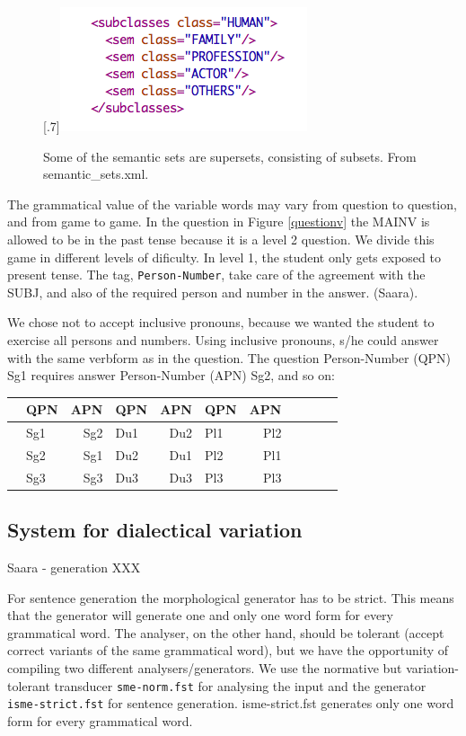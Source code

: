 \documentclass[a4paper,12pt]{article}
\begin{document}
\begin{figure}[htbp]
\begin{center}
\scalebox{.7}[.7]{\includegraphics{img/semantic_set.png}}\\
\caption{Some of the semantic sets are supersets, consisting of subsets. From semantic\_sets.xml.}
\label{semset}
\end{center}
\end{figure}

The grammatical value of the variable words may vary from question to question, and from game to game.
In the question in Figure \ref{questionv} the MAINV is allowed to be in the past tense because it is a level 2 question. We divide this game in different levels of dificulty. In level 1, the student only gets exposed to present tense. The tag, \texttt{Person-Number}, take care of the agreement with the SUBJ, and also of the required person and number in the answer. (Saara).

We chose not to accept inclusive pronouns, because we wanted the student to exercise all persons and numbers. Using inclusive pronouns, s/he could answer with the same verbform as in the question. The question Person-Number (QPN) Sg1 requires answer Person-Number (APN) Sg2, and so on:\\


\begin{tabular}[t]{rlrlrlrlrlr}
&QPN &APN &QPN &APN &QPN &APN \\
\hline
&Sg1 &Sg2 &Du1 &Du2 &Pl1 &Pl2 \\
&Sg2 &Sg1 &Du2 &Du1 &Pl2 &Pl1 \\
&Sg3 &Sg3 &Du3 &Du3 &Pl3 &Pl3 \\
\end{tabular}


\subsection{System for dialectical variation}\label{dialect}
Saara - generation XXX

For sentence generation the morphological generator has to be strict. This means that the generator will generate one and only one word form for every grammatical word. The analyser, on the other hand, should be tolerant (accept correct variants of the same grammatical word), but we have the opportunity of compiling two different analysers/generators. We use the normative but variation-tolerant transducer \texttt{sme-norm.fst} for analysing the input and the generator \texttt{isme-strict.fst} for sentence generation. isme-strict.fst generates only one word form for every grammatical word.
\end{document}
